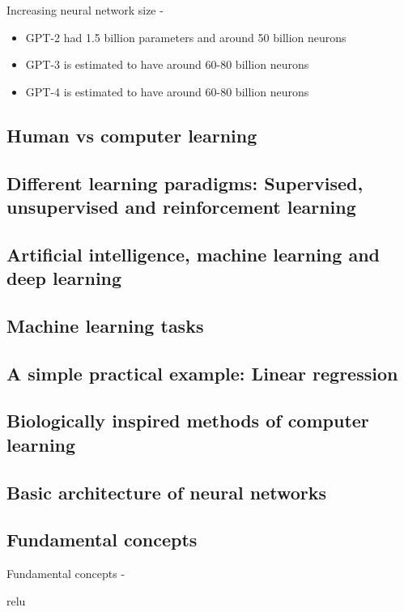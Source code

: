 \begin{frame}[t,allowframebreaks]{Increasing neural network size - }
    \framebreak


    \begin{itemize}
        \item GPT-2 had 1.5 billion parameters and around 50 billion neurons
        \item GPT-3 is estimated to have around 60-80 billion neurons
        \item GPT-4 is estimated to have around 60-80 billion neurons
    \end{itemize}

\end{frame}


\subsection{Human vs computer learning}

\subsection{Different learning paradigms: Supervised, unsupervised and reinforcement learning}

\subsection{Artificial intelligence, machine learning and deep learning}

\subsection{Machine learning tasks}

\subsection{A simple practical example: Linear regression}

\subsection{Biologically inspired methods of computer learning}

\subsection{Basic architecture of neural networks}

\subsection{Fundamental concepts}
\begin{frame}[t,allowframebreaks]{Fundamental concepts - }

    \gls{relu}
\end{frame}


